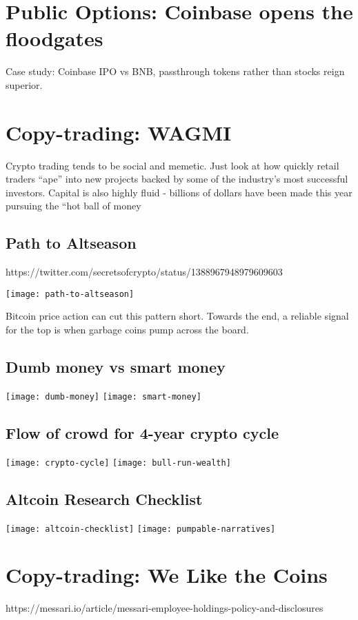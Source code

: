 \documentclass{../notes}
\begin{document}
\section{Public Options: Coinbase opens the floodgates}
Case study: Coinbase IPO vs BNB, passthrough tokens rather than stocks reign superior. 
\section{Copy-trading: WAGMI}
Crypto trading tends to be social and memetic. Just look at how quickly retail traders “ape” into new projects backed by some of the industry’s most successful investors. Capital is also highly fluid - billions of dollars have been made this year pursuing the “hot ball of money
\subsection{Path to Altseason}
https://twitter.com/secretsofcrypto/status/1388967948979609603

\texttt{[image: path-to-altseason]}

Bitcoin price action can cut this pattern short. Towards the end, a reliable signal for the top is when garbage coins pump across the board. 

\subsection{Dumb money vs smart money}
\texttt{[image: dumb-money]}
\texttt{[image: smart-money]}

\subsection{Flow of crowd for 4-year crypto cycle}
\texttt{[image: crypto-cycle]}
\texttt{[image: bull-run-wealth]}

\subsection{Altcoin Research Checklist}
\texttt{[image: altcoin-checklist]}
\texttt{[image: pumpable-narratives]}


\section{Copy-trading: We Like the Coins}
https://messari.io/article/messari-employee-holdings-policy-and-disclosures
\end{document}
